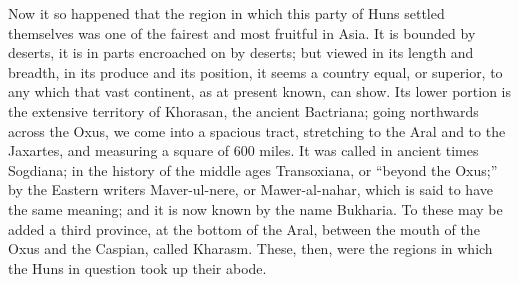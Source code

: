 Now it so happened that the
region in which this party of Huns settled themselves was one of the
fairest and most fruitful in Asia. It is bounded by deserts, it is in parts encroached on by deserts; but viewed in its length and
breadth, in its produce and its position, it seems a country equal, or
superior, to any which that vast continent, as at present known, can
show. Its lower portion is the extensive territory of Khorasan, the
ancient Bactriana; going northwards across the Oxus, we come into a
spacious tract, stretching to the Aral and to the Jaxartes, and
measuring a square of 600 miles. It was called in ancient times
Sogdiana; in the history of the middle ages Transoxiana, or ``beyond
the Oxus;'' by the Eastern writers Maver-ul-nere, or Mawer-al-nahar,
which is said to have the same meaning; and it is now known by the
name Bukharia. To these may be added a third province, at the bottom
of the Aral, between the mouth of the Oxus and the Caspian, called
Kharasm. These, then, were the regions in which the Huns in question
took up their abode.

